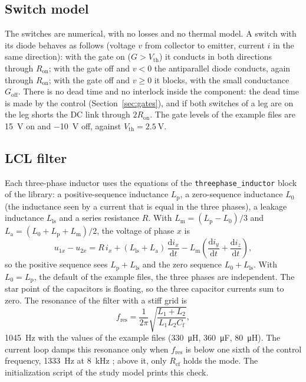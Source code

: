 \documentclass[11pt,a4paper]{scrartcl}
\newcommand{\ped}[1]{_{\mathrm{#1}}}
\newcommand{\code}[1]{\texttt{#1}}
\begin{document}
\begin{onehalfspace}
\subsection{Switch model}
\label{sec:switch}

The switches are numerical, with no losses and no thermal model. A switch with its diode behaves as follows (voltage $v$ from collector to emitter, current $i$ in the same direction): with the gate on ($G > V\ped{th}$) it conducts in both directions through $R\ped{on}$; with the gate off and $v < 0$ the antiparallel diode conducts, again through $R\ped{on}$; with the gate off and $v \ge 0$ it blocks, with the small conductance $G\ped{off}$. There is no dead time and no interlock inside the component: the dead time is made by the control (Section~\ref{sec:gates}), and if both switches of a leg are on the leg shorts the DC link through $2 R\ped{on}$. The gate levels of the example files are \SI{15}{\volt} on and \SI{-10}{\volt} off, against $V\ped{th} = \SI{2.5}{\volt}$.

\subsection{LCL filter}
\label{sec:lcl_eq}

Each three-phase inductor uses the equations of the \code{threephase\_inductor} block of the library: a positive-sequence inductance $L\ped{p}$, a zero-sequence inductance $L\ped{0}$ (the inductance seen by a current that is equal in the three phases), a leakage inductance $L\ped{ls}$ and a series resistance $R$. With $L\ped{m} = (L\ped{p} - L\ped{0})/3$ and $L\ped{a} = (L\ped{0} + L\ped{p} + L\ped{m})/2$, the voltage of phase $x$ is
\begin{equation}
	u_{1x} - u_{2x} = R\, i_x + (L\ped{ls} + L\ped{a})\, \frac{\mathrm{d} i_x}{\mathrm{d} t} - L\ped{m} \left( \frac{\mathrm{d} i_y}{\mathrm{d} t} + \frac{\mathrm{d} i_z}{\mathrm{d} t} \right),
	\label{eq:inductor}
\end{equation}
so the positive sequence sees $L\ped{p} + L\ped{ls}$ and the zero sequence $L\ped{0} + L\ped{ls}$. With $L\ped{0} = L\ped{p}$, the default of the example files, the three phases are independent. The star point of the capacitors is floating, so the three capacitor currents sum to zero. The resonance of the filter with a stiff grid is
\begin{equation}
	f\ped{res} = \frac{1}{2\pi} \sqrt{\frac{L\ped{1} + L\ped{2}}{L\ped{1} L\ped{2} C\ped{f}}},
	\label{eq:fres}
\end{equation}
\SI{1045}{\hertz} with the values of the example files (\SI{330}{\micro\henry}, \SI{360}{\micro\farad}, \SI{80}{\micro\henry}). The current loop damps this resonance only when $f\ped{res}$ is below one sixth of the control frequency, \SI{1333}{\hertz} at \SI{8}{\kilo\hertz} \cite{parker2014}; above it, only $R\ped{cf}$ holds the mode. The initialization script of the study model prints this check.


\end{onehalfspace}
\end{document}
